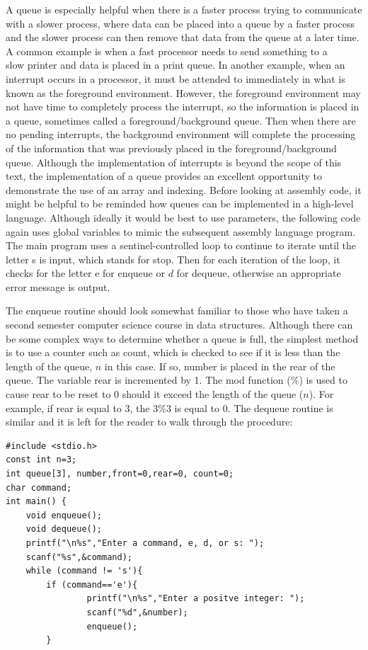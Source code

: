 \documentclass[10pt]{book}
\begin{document}
A queue is especially helpful when there is a faster process trying to communicate with a slower process, where data can be placed into a queue by a faster process and the slower process can then remove that data from the queue at a later time. A common example is when a fast processor needs to send something to a\\
slow printer and data is placed in a print queue. In another example, when an interrupt occurs in a processor, it must be attended to immediately in what is known as the foreground environment. However, the foreground environment may not have time to completely process the interrupt, so the information is placed in a queue, sometimes called a foreground/background queue. Then when there are no pending interrupts, the background environment will complete the processing of the information that was previously placed in the foreground/background queue. Although the implementation of interrupts is beyond the scope of this text, the implementation of a queue provides an excellent opportunity to demonstrate the use of an array and indexing.
Before looking at assembly code, it might be helpful to be reminded how queues can be implemented in a high-level language. Although ideally it would be best to use parameters, the following code again uses global variables to mimic the subsequent assembly language program. The main program uses a sentinel-controlled loop to continue to iterate until the letter s is input, which stands for stop. Then for each iteration of the loop, it checks for the letter e for enqueue or $d$ for dequeue, otherwise an appropriate error message is output.

The enqueue routine should look somewhat familiar to those who have taken a second semester computer science course in data structures. Although there can be some complex ways to determine whether a queue is full, the simplest method is to use a counter such as count, which is checked to see if it is less than the length of the queue, $n$ in this case. If so, number is placed in the rear of the queue. The variable rear is incremented by 1. The mod function (\%) is used to cause rear to be reset to 0 should it exceed the length of the queue ($n$). For example, if rear is equal to 3, the $3 \% 3$ is equal to 0. The dequeue routine is similar and it is left for the reader to walk through the procedure:

\begin{verbatim}
#include <stdio.h>
const int n=3;
int queue[3], number,front=0,rear=0, count=0;
char command;
int main() {
    void enqueue();
    void dequeue();
    printf("\n%s","Enter a command, e, d, or s: ");
    scanf("%s",&command);
    while (command != 's'){
        if (command=='e'){
                printf("\n%s","Enter a positve integer: ");
                scanf("%d",&number);
                enqueue();
        }
\end{verbatim}
\end{document}

